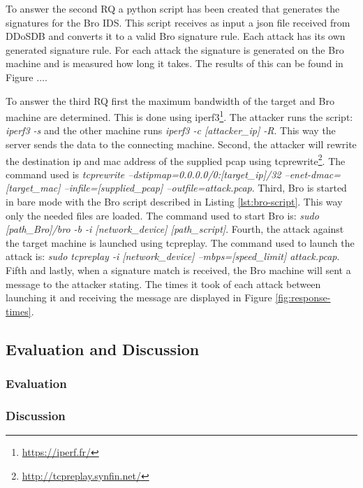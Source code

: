 To answer the second RQ a python script has been created that generates the signatures for the Bro IDS. This script receives as input a json file received from DDoSDB and converts it to a valid Bro signature rule. Each attack has its own generated signature rule. For each attack the signature is generated on the Bro machine and is measured how long it takes. The results of this can be found in Figure $\dots$.

To answer the third RQ first the maximum bandwidth of the target and Bro machine are determined. This is done using iperf3\footnote{\url{https://iperf.fr/}}. The attacker runs the script: \emph{iperf3 -s} and the other machine runs \emph{iperf3 -c [attacker\_ip] -R}. This way the server sends the data to the connecting machine. Second, the attacker will rewrite the destination ip and mac address of the supplied pcap using tcprewrite\footnote{\url{http://tcpreplay.synfin.net/}}. The command used is \emph{tcprewrite --dstipmap=0.0.0.0/0:[target\_ip]/32 --enet-dmac=[target\_mac] --infile=[supplied\_pcap] --outfile=attack.pcap}. Third, Bro is started in bare mode with the Bro script described in Listing \ref{lst:bro-script}. This way only the needed files are loaded. The command used to start Bro is: \emph{sudo [path\_Bro]/bro -b -i [network\_device] [path\_script]}. Fourth, the attack against the target machine is launched using tcpreplay. The command used to launch the attack is: \emph{sudo tcpreplay -i [network\_device] --mbps=[speed\_limit] attack.pcap}. Fifth and lastly, when a signature match is received, the Bro machine will sent a message to the attacker stating. The times it took of each attack between launching it and receiving the message are displayed in Figure \ref{fig:response-times}.









\subsection{Evaluation and Discussion}\label{subsec:evaluation-discussion}
\subsubsection{Evaluation}\label{subsubsec:evalutation}
\subsubsection{Discussion}\label{subsubsec:discussion}
